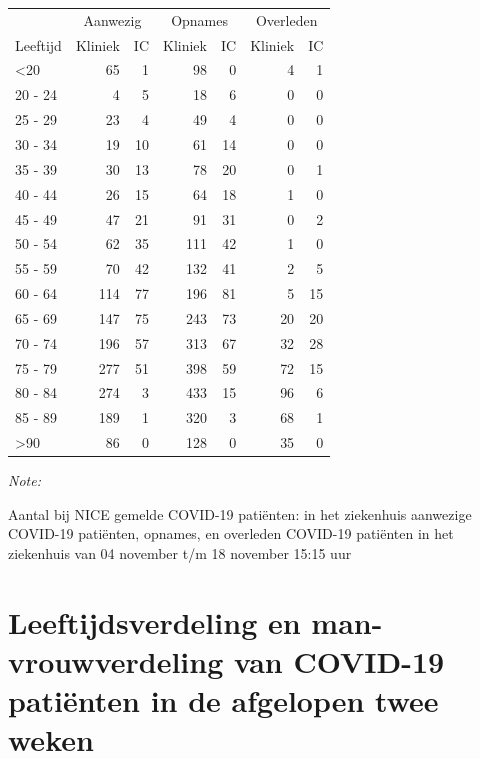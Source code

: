 \documentclass[
  english,
  man,floatsintext]{apa6}
\begin{document}
\begin{table}
\centering\begingroup\fontsize{10}{12}\selectfont

\begin{threeparttable}
\begin{tabular}{lrrrrrr}
\toprule
\multicolumn{1}{c}{ } & \multicolumn{2}{c}{Aanwezig} & \multicolumn{2}{c}{Opnames} & \multicolumn{2}{c}{Overleden} \\
\cmidrule(l{3pt}r{3pt}){2-3} \cmidrule(l{3pt}r{3pt}){4-5} \cmidrule(l{3pt}r{3pt}){6-7}
Leeftijd & Kliniek & IC & Kliniek & IC & Kliniek & IC\\
\midrule
<20 & 65 & 1 & 98 & 0 & 4 & 1\\
20 - 24 & 4 & 5 & 18 & 6 & 0 & 0\\
25 - 29 & 23 & 4 & 49 & 4 & 0 & 0\\
30 - 34 & 19 & 10 & 61 & 14 & 0 & 0\\
35 - 39 & 30 & 13 & 78 & 20 & 0 & 1\\
40 - 44 & 26 & 15 & 64 & 18 & 1 & 0\\
45 - 49 & 47 & 21 & 91 & 31 & 0 & 2\\
50 - 54 & 62 & 35 & 111 & 42 & 1 & 0\\
55 - 59 & 70 & 42 & 132 & 41 & 2 & 5\\
60 - 64 & 114 & 77 & 196 & 81 & 5 & 15\\
65 - 69 & 147 & 75 & 243 & 73 & 20 & 20\\
70 - 74 & 196 & 57 & 313 & 67 & 32 & 28\\
75 - 79 & 277 & 51 & 398 & 59 & 72 & 15\\
80 - 84 & 274 & 3 & 433 & 15 & 96 & 6\\
85 - 89 & 189 & 1 & 320 & 3 & 68 & 1\\
>90 & 86 & 0 & 128 & 0 & 35 & 0\\
\bottomrule
\end{tabular}
\begin{tablenotes}
\item \textit{Note: } 
\item Aantal bij NICE gemelde COVID-19 patiënten: in het ziekenhuis aanwezige COVID-19 patiënten, opnames, en overleden COVID-19 patiënten in het ziekenhuis van 04 november t/m 18 november 15:15 uur
\end{tablenotes}
\end{threeparttable}
\endgroup{}
\end{table}

\newpage

\hypertarget{leeftijdsverdeling-en-man-vrouwverdeling-van-covid-19-patiuxebnten-in-de-afgelopen-twee-weken}{%
\section{Leeftijdsverdeling en man-vrouwverdeling van COVID-19 patiënten in de afgelopen twee weken}\label{leeftijdsverdeling-en-man-vrouwverdeling-van-covid-19-patiuxebnten-in-de-afgelopen-twee-weken}}
\end{document}
